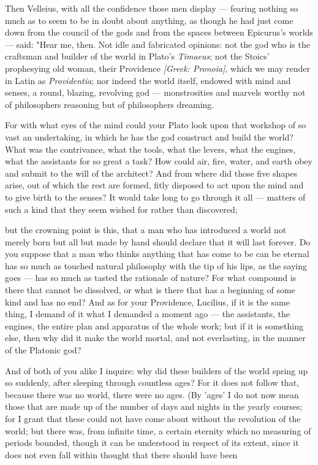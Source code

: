  Then Velleius, with all the confidence those men display — fearing nothing so much as to seem to be in doubt about anything, as though he had just come down from the council of the gods and from the spaces between Epicurus's worlds — said: "Hear me, then. Not idle and fabricated opinions: not the god who is the craftsman and builder of the world in Plato's \textit{Timaeus}; not the Stoics' prophesying old woman, their Providence \textit{[Greek: Pronoia]}, which we may render in Latin as \textit{Providentia}; nor indeed the world itself, endowed with mind and senses, a round, blazing, revolving god — monstrosities and marvels worthy not of philosophers reasoning but of philosophers dreaming.

 For with what eyes of the mind could your Plato look upon that workshop of so vast an undertaking, in which he has the god construct and build the world? What was the contrivance, what the tools, what the levers, what the engines, what the assistants for so great a task? How could air, fire, water, and earth obey and submit to the will of the architect? And from where did those five shapes arise, out of which the rest are formed, fitly disposed to act upon the mind and to give birth to the senses? It would take long to go through it all — matters of such a kind that they seem wished for rather than discovered;

 but the crowning point is this, that a man who has introduced a world not merely born but all but made by hand should declare that it will last forever. Do you suppose that a man who thinks anything that has come to be can be eternal has so much as touched natural philosophy with the tip of his lips, as the saying goes — has so much as tasted the rationale of nature? For what compound is there that cannot be dissolved, or what is there that has a beginning of some kind and has no end? And as for your Providence, Lucilius, if it is the same thing, I demand of it what I demanded a moment ago — the assistants, the engines, the entire plan and apparatus of the whole work; but if it is something else, then why did it make the world mortal, and not everlasting, in the manner of the Platonic god?

 And of both of you alike I inquire: why did these builders of the world spring up so suddenly, after sleeping through countless ages? For it does not follow that, because there was no world, there were no ages. (By 'ages' I do not now mean those that are made up of the number of days and nights in the yearly courses; for I grant that these could not have come about without the revolution of the world; but there was, from infinite time, a certain eternity which no measuring of periods bounded, though it can be understood in respect of its extent, since it does not even fall within thought that there should have been

